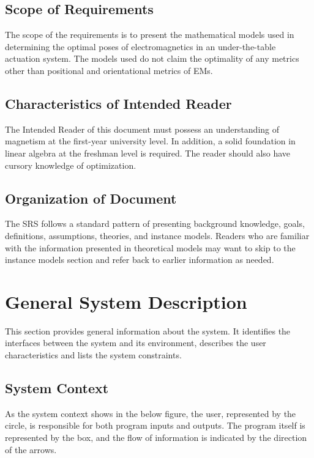 \documentclass[12pt]{article}
\begin{document}
\subsection{Scope of Requirements} 
The scope of the requirements is to present the mathematical models used in determining the optimal poses of electromagnetics in an under-the-table actuation system. The models used do not claim the optimality of any metrics other than positional and orientational metrics of EMs.   


\subsection{Characteristics of Intended Reader} \label{sec_IntendedReader}
The Intended Reader of this document must possess an understanding of magnetism at the first-year university level. In addition, a solid foundation in linear algebra at the freshman level is required. The reader should also have cursory knowledge of optimization.

\subsection{Organization of Document}
The SRS follows a standard pattern of presenting background knowledge, goals, definitions, assumptions, theories, and instance models. Readers who are familiar with the information presented in theoretical models may want to skip to the instance models section and refer back to earlier information as needed. 


\section{General System Description}

This section provides general information about the system.  It identifies the
interfaces between the system and its environment, describes the user
characteristics and lists the system constraints.

\subsection{System Context} \label{Sec_SysContext}
As the system context shows in the below figure, the user, represented by the circle, is responsible for both program inputs and outputs. The program itself is represented by the box, and the flow of information is indicated by the direction of the arrows. 
\end{document}
